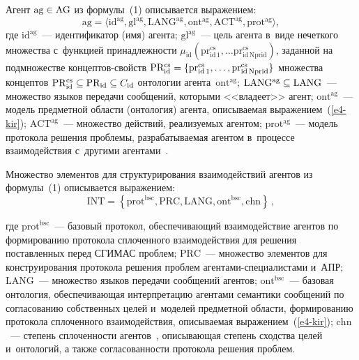 \begin{multicols}{2}
  Агент $\mathrm{ag}\hm\in \mathrm{AG}$ из формулы~(1) описывается 
выражением:
  \begin{equation}
 \! \mathrm{ag}=\langle \mathrm{id^{ag}}, \mathrm{gl^{ag}}, 
\mathrm{LANG^{ag}}, \mathrm{ont^{ag}}, \mathrm{ACT^{ag}}, 
\mathrm{prot^{ag}}\rangle,\!\!
  \label{e2-kir}
  \end{equation}
где $\mathrm{id^{ag}}$~--- идентификатор (имя) агента;  
$\mathrm{gl^{ag}}$~--- цель агента в~виде нечеткого множества с~функцией 
принадлежности $\mu_{\mathrm{id}} 
(\mathrm{pr}^{\mathrm{cs}}_{\mathrm{id}\,1},\ldots 
\mathrm{pr}^{\mathrm{cs}}_{\mathrm{id}\,\mathrm{Nprid}})$, за\-данной на подмножестве  
кон\-цеп\-тов-свойств $\mathrm{PR_{id}^{cs}}\hm= \{ 
\mathrm{pr^{cs}_{id\,1}},\ldots , \mathrm{pr}^{\mathrm{cs}}_{\mathrm{id}\,\mathrm{Nprid}}\}$ множества 
концептов $\mathrm{PR_{id}^{cs}}\hm\subseteq \mathrm{PR_{id}}\hm\subseteq 
C_{\mathrm{id}}$ онтологии агента~$\mathrm{ont^{ag}}$; 
$\mathrm{LANG^{ag}}\hm\subseteq \mathrm{LANG}$~--- множество языков 
передачи сообщений, которыми <<владеет>> агент; $\mathrm{ont^{ag}}$~--- 
модель предметной области (онтология) агента, описываемая 
выражением~(\ref{e4-kir}); $\mathrm{ACT^{ag}}$~--- множество действий, 
реализуемых агентом; $\mathrm{prot^{ag}}$~--- модель протокола решения 
проблемы, разрабатываемая агентом в~процессе взаимодействия с~другими 
агентами~\cite{4-kir}. 
  
  Множество элементов для структурирования взаимодействий агентов из 
формулы~(1) описывается выражением:
  \begin{equation}
  \mathrm{INT}= \left\{ \mathrm{prot^{bsc}}, \mathrm{PRC}, \mathrm{LANG}, 
\mathrm{ont^{bsc}}, \mathrm{chn}\right\}\,,
  \label{e3-kir}
  \end{equation}
  
  \vspace*{-2pt}
  
  \noindent
где $\mathrm{prot^{bsc}}$~--- базовый протокол, обеспечивающий 
взаимодействие агентов по формированию протокола сплоченного 
взаимодействия для решения поставленных перед \mbox{СГИМАС} проб\-лем; 
$\mathrm{PRC}$~--- множество элементов для конструирования протокола 
решения проблем аген\-та\-ми-спе\-ци\-а\-лис\-та\-ми и~АПР; 
$\mathrm{LANG}$~--- множество языков передачи сообщений агентов; 
$\mathrm{ont^{bsc}}$~--- базовая онтология, обеспечивающая интерпретацию 
агентами семантики сообщений по согласованию собственных целей и~моделей 
предметной области, формированию протокола сплоченного взаимодействия, 
описываемая выражением~(\ref{e4-kir}); $\mathrm{chn}$~--- степень 
сплоченности агентов~\cite{2-kir}, опи\-сы\-ва\-ющая степень сходства целей 
и~онтологий, а также согласованности протокола решения проблем.
  

\end{multicols}
